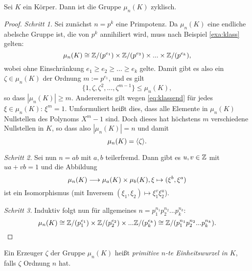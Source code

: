 \documentclass{book}
\begin{document}
\begin{prop}
    \label{prop:ewzyklisch}
    Sei $K$ ein Körper. Dann ist die Gruppe $\mu_n(K)$ zyklisch. 
\end{prop}
\begin{proof}
    
    \emph{Schritt 1.}
    Sei zunächst $n = p^k$ eine Primpotenz. Da $\mu_n(K)$ eine endliche abelsche Gruppe ist, die von $p^k$ annihiliert wird, muss nach Beispiel \ref{exa:klass} gelten:
    \begin{equation}\label{eq:klassend}
            \mu_n(K) \cong \mathbb{Z}/(p^{e_1})  \times \mathbb{Z}/(p^{e_2}) \times ... \times \mathbb{Z}/(p^{e_k}),
        \end{equation}
    wobei ohne Einschränkung $e_1 \ge e_2 \ge ... \ge e_k$ gelte. Damit gibt es also
    ein $\zeta \in \mu_n(K)$ der Ordnung $m := p^{e_1}$, und es gilt
    \[
        \{1, \zeta, \zeta^2, ..., \zeta^{m-1} \} \le \mu_n(K),
    \]
    so dass $|\mu_n(K)| \ge m$. Andererseits gilt wegen \eqref{eq:klassend} für
    jedes $\xi \in \mu_n(K)$: $\xi^m = 1$. Umformuliert heißt dies, dass alle
    Elemente in $\mu_n(K)$ Nullstellen des Polynoms $X^m -1$ sind. Doch dieses hat höchstens $m$ verschiedene Nullstellen in $K$, so dass also $|\mu_n(K)| = n$ und damit
    \[
        \mu_n(K) = \langle \zeta \rangle.
    \]

    \emph{Schritt 2.} Sei nun $n = ab$ mit $a,b$ teilerfremd. Dann gibt es $u,v \in \mathbb{Z}$ mit $ua + v b = 1$ und die Abbildung
    \[
        \mu_n(K) \longrightarrow \mu_a(K) \times \mu_b(K), \xi \mapsto (\xi^b, \xi^a)
    \]
    ist ein Isomorphismus (mit Inversem $(\xi_1, \xi_2) \mapsto \xi_1^v\xi_2^u$). 

    \emph{Schritt 3.} Induktiv folgt nun für allgemeines $n = p_1^{n_1} p_2^{n_2} ... p_k^{n_k}$:
        \[
            \mu_n(K) \cong \mathbb{Z}/(p_1^{e_1}) \times \mathbb{Z}/(p_2^{e_2}) \times ... \mathbb{Z}/(p_k^{e_k}) \cong \mathbb{Z}/(p_1^{n_1} p_2^{n_2} ... p_k^{n_k}).
        \]
\end{proof}

\begin{term}
    \label{term:primew}
    Ein Erzeuger $\zeta$ der Gruppe $\mu_n(K)$ heißt {\em primitive $n$-te Einheitswurzel in $K$}, falls $\zeta$ Ordnung $n$ hat. 
\end{term}
\end{document}
